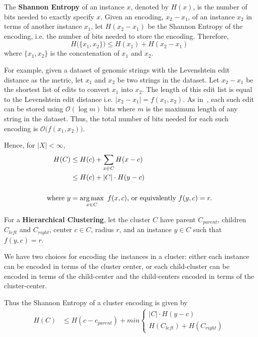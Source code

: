 The \textbf{Shannon Entropy} of an instance $x$, denoted by $H(x)$, is the number of bits needed to exactly specify $x$.
Given an encoding, $x_2 - x_1$, of an instance $x_2$ in terms of another instance $x_1$, let $H(x_2 - x_1)$ be the Shannon Entropy of the encoding, i.e. the number of bits needed to store the encoding.
Therefore, \[ H \big( \{ x_1, x_2 \} \big) \leq H(x_1) + H(x_2 - x_1) \] where $\{ x_1, x_2 \}$ is the concatenation of $x_1$ and $x_2$.

For example, given a dataset of genomic strings with the Levenshtein edit distance as the metric, let $x_1$ and $x_2$ be two strings in the dataset.
Let $x_2 - x_1$ be the shortest list of edits to convert $x_1$ into $x_2$.
The length of this edit list is equal to the Levenshtein edit distance i.e. $|x_2 - x_1| = f(x_1, x_2)$.
As in~\cite{berger2020levenshtein}, each such edit can be stored using $\mathcal{O}(\log m)$ bits where $m$ is the maximum length of any string in the dataset.
Thus, the total number of bits needed for each such encoding is $\mathcal{O} \big( f(x_1, x_2) \big)$.

Hence, for $|X| < \infty$,
\begin{align*}
    H (C) &\leq H(c) + \sum_{x \in C} H(x - c) \\
    &\leq H(c) + |C| \cdot H(y - c) \\ \\
    \text{where} \ y &= \operatorname*{arg\,max}_{x \in C} \ f(x, c) \text{, or equivalently} \ f(y, c) = r.
\end{align*}

For a \textbf{Hierarchical Clustering}, let the cluster $C$ have parent $C_{parent}$, children $C_{left}$ and $C_{right}$, center $c \in C$, radius $r$, and an instance $y \in C$ such that $f(y, c) = r$.

We have two choices for encoding the instances in a cluster:
either each instance can be encoded in terms of the cluster center, 
or each child-cluster can be encoded in terms of the child-center and the child-centers encoded in terms of the cluster-center.

Thus the Shannon Entropy of a cluster encoding is given by
\begin{align}
    \label{eq:hierarchical-shannon-entropy}
    H(C) &\leq H(c - c_{parent}) + min \begin{cases}
        |C| \cdot H(y - c) \\
        H(C_{left}) + H(C_{right})
    \end{cases}
\end{align}

